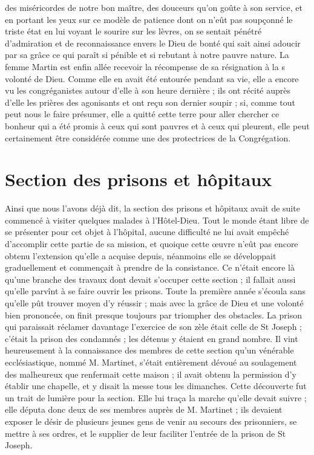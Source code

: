 des miséricordes de notre bon maître, des douceurs qu'on goûte à son service, et en portant les yeux sur ce modèle de patience dont on n'eût pas soupçonné le triste état en lui voyant le sourire sur les lèvres, on se sentait pénétré d'admiration et de reconnaissance envers le Dieu de bonté qui sait ainsi adoucir par sa grâce ce qui paraît si pénible et si rebutant à notre pauvre nature. La femme Martin est enfin allée recevoir la récompense de sa résignation à la s volonté de Dieu. Comme elle en avait été entourée pendant sa vie, elle a encore vu les congréganistes autour d'elle à son heure dernière ; ils ont récité auprès d'elle les prières des agonisants et ont reçu son dernier soupir ; si, comme tout peut nous le faire présumer, elle a quitté cette terre pour aller chercher ce bonheur qui a été promis à ceux qui sont pauvres et à ceux qui pleurent, elle peut certainement être considérée comme une des protectrices de la Congrégation.

\section*{Section des prisons et hôpitaux}
Ainsi que nous l'avons déjà dit, la section des prisons et hôpitaux avait de suite commencé à visiter quelques malades à l'Hôtel-Dieu. Tout le monde étant libre de se présenter pour cet objet à l'hôpital, aucune difficulté ne lui avait empêché d'accomplir cette partie de sa mission, et quoique cette œuvre n'eût pas encore obtenu l'extension qu'elle a acquise depuis, néanmoins elle se développait graduellement et commençait à prendre de la consistance. Ce n'était encore là qu'une branche des travaux dont devait s'occuper cette section ; il fallait aussi qu'elle parvînt à se faire ouvrir les prisons. Toute la première année s'écoula sans qu'elle pût trouver moyen d'y réussir ; mais avec la grâce de
Dieu et une volonté bien prononcée, on finit presque toujours par triompher des obstacles. La prison qui paraissait réclamer davantage l'exercice de son zèle était celle de St Joseph ; c'était la prison des condamnés ; les détenus y étaient en grand nombre. Il vint heureusement à la connaissance des membres de cette section qu'un vénérable ecclésiastique, nommé M. Martinet, s'était entièrement dévoué au soulagement des malheureux que renfermait cette maison ; il avait obtenu la permission d'y établir une chapelle, et y disait la messe tous les dimanches. Cette découverte fut un trait de lumière pour la section. Elle lui traça la marche qu'elle devait suivre ; elle députa donc deux de ses membres auprès de M. Martinet ; ils devaient exposer le désir de plusieurs jeunes gens de venir au secours des prisonniers, se mettre à ses ordres, et le supplier de leur faciliter l'entrée de la prison de St Joseph.

